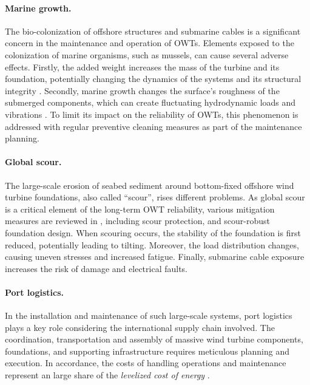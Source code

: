 

\paragraph{Marine growth.}
The bio-colonization of offshore structures and submarine cables is a significant concern in the maintenance and operation of OWTs. 
Elements exposed to the colonization of marine organisms, such as mussels, can cause several adverse effects. 
Firstly, the added weight increases the mass of the turbine and its foundation, potentially changing the dynamics of the systems and its structural integrity \citep{ameryoun_2019_marine_growth,schoefs_2022_reliability_marine_growth}. 
Secondly, marine growth changes the surface's roughness of the submerged components, which can create fluctuating hydrodynamic loads and vibrations \citep{marty_2021_cable_marine_growth}. 
To limit its impact on the reliability of OWTs, this phenomenon is addressed with regular preventive cleaning measures as part of the maintenance planning. 


\paragraph{Global scour.}
The large-scale erosion of seabed sediment around bottom-fixed offshore wind turbine foundations, also called ``scour'', rises different problems. 
As global scour is a critical element of the long-term OWT reliability, various mitigation measures are reviewed in \citet{fazeres_2021_scour}, including scour protection, and scour-robust foundation design.
When scouring occurs, the stability of the foundation is first reduced, potentially leading to tilting. 
Moreover, the load distribution changes, causing uneven stresses and increased fatigue. 
Finally, submarine cable exposure increases the risk of damage and electrical faults. 


\paragraph{Port logistics.}
In the installation and maintenance of such large-scale systems, port logistics plays a key role considering the international supply chain involved. 
The coordination, transportation and assembly of massive wind turbine components, foundations, and supporting infrastructure requires meticulous planning and execution. 
In accordance, the costs of handling operations and maintenance represent an large share of the \textit{levelized cost of energy} \citep{shields_2021_owt_lcoe}.  

